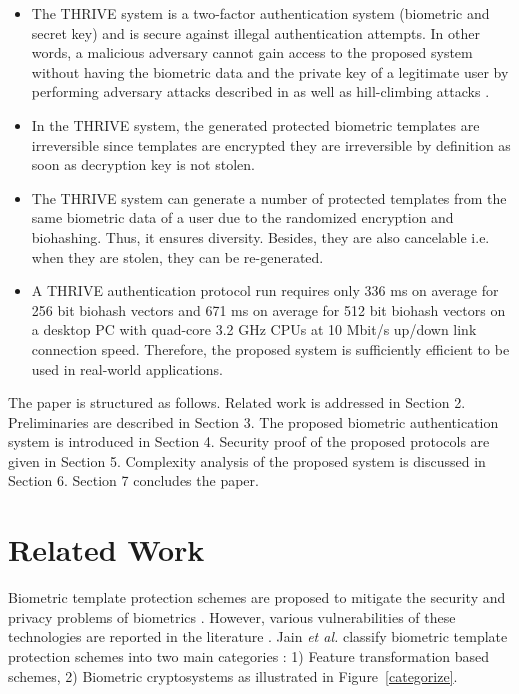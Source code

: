 \documentclass[journal]{IEEEtran}
\begin{document}
\begin{itemize}
\item The THRIVE system is a two-factor authentication system (biometric and secret key) and is secure against illegal authentication attempts. In other words, a malicious adversary cannot gain access to the proposed system without having the biometric data and the private key of a legitimate user by performing adversary attacks described in \cite{Ratha2} as well as hill-climbing attacks \cite{Adler2, Galbally, Uhl, Martinez}.

\item In the THRIVE system, the generated protected biometric templates are irreversible since templates are encrypted they are irreversible by definition as soon as decryption key is not stolen. 

\item The THRIVE system can generate a number of protected templates from the same biometric data of a user due to the randomized encryption and biohashing. Thus, it ensures diversity. Besides, they are also cancelable i.e. when they are stolen, they can be re-generated.

\item A THRIVE  authentication protocol run requires only 336 ms on average for 256 bit biohash vectors and 671 ms on average for 512 bit biohash vectors on a desktop PC with quad-core 3.2 GHz CPUs at 10 Mbit/s up/down link connection speed. Therefore, the proposed system is sufficiently efficient to be used in real-world applications.

\end{itemize}

The paper is structured as follows. Related work is addressed in Section 2. Preliminaries are described in Section 3. The proposed biometric authentication system is introduced in Section 4. Security proof of the proposed protocols are given in Section 5. Complexity analysis of the proposed system is discussed in Section 6.  Section 7 concludes the paper.

\section{Related Work}

Biometric template protection schemes are proposed to mitigate the security and privacy problems of biometrics \cite{Jain2, Matsumoto, Putte, Bringer, Barni, Nkumar, Feng, Bui, Juels}. However, various vulnerabilities of these technologies are reported in the literature \cite{Scheirer, Adler, Boult}. Jain \textit{et al.} classify biometric template protection schemes into two main categories \cite{Jain2}: 1) Feature transformation based schemes, 2) Biometric cryptosystems as illustrated in Figure~\ref{categorize}. 
\end{document}
